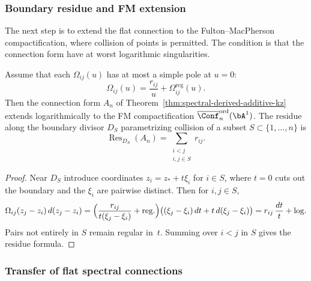 \subsubsection{Boundary residue and FM extension}

The next step is to extend the flat connection to the
Fulton--MacPherson compactification, where collision of points
is permitted. The condition is that the connection form have
at worst logarithmic singularities.

\begin{theorem}
\label{thm:spectral-boundary-residue}
Assume that each $\Omega_{ij}(u)$ has at most a simple pole at
$u = 0$:
\[
 \Omega_{ij}(u) = \frac{r_{ij}}{u} + \Omega_{ij}^{\mathrm{reg}}(u).
\]
Then the connection form $A_n$ of
Theorem~\textup{\ref{thm:spectral-derived-additive-kz}} extends
logarithmically to the FM compactification
$\overline{\Conf}_n^{\mathrm{ord}}(\bA^1)$. The residue along
the boundary divisor $D_S$ parametrizing collision of a subset
$S \subset \{1,\ldots,n\}$ is
\[
 \operatorname{Res}_{D_S}(A_n)
 = \sum_{\substack{i < j \\ i,j \in S}} r_{ij}.
\]
\end{theorem}

\begin{proof}
Near $D_S$ introduce coordinates $z_i = z_* + t\xi_i$ for
$i \in S$, where $t = 0$ cuts out the boundary and the
$\xi_i$ are pairwise distinct. Then for $i,j \in S$,
\[
 \Omega_{ij}(z_j - z_i)\,d(z_j - z_i)
 =
 \Bigl(\frac{r_{ij}}{t(\xi_j - \xi_i)} + \text{reg.}\Bigr)
 \bigl((\xi_j-\xi_i)\,dt + t\,d(\xi_j-\xi_i)\bigr)
 =
 r_{ij}\,\frac{dt}{t} + \text{log.}
\]
Pairs not entirely in $S$ remain regular in~$t$. Summing
over $i < j$ in $S$ gives the residue formula.
\end{proof}

\subsubsection{Transfer of flat spectral connections}

